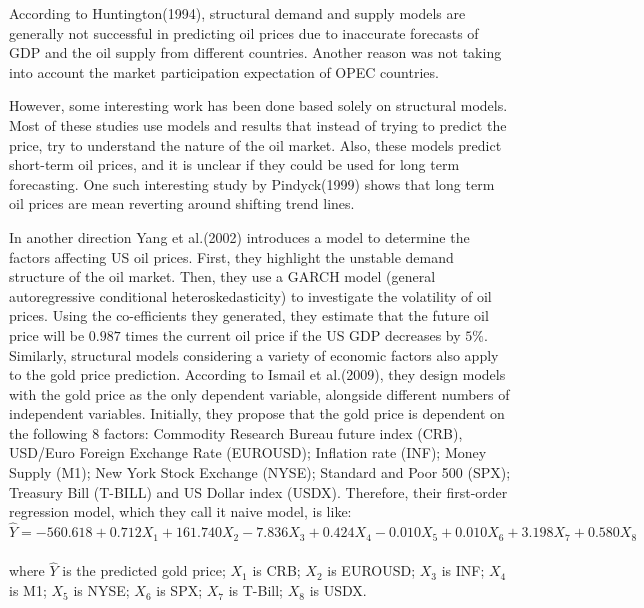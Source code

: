 \documentclass[runningheads]{llncs}
\begin{document}
According to Huntington(1994)\cite{huntington}, structural demand and supply models are generally not successful in predicting oil prices due to inaccurate forecasts of GDP and the oil supply from different countries. Another reason was not taking into account the market participation expectation of OPEC countries. 

However, some interesting work has been done based solely on structural models. Most of these studies use models and results that instead of trying to predict the price, try to understand the nature of the oil market. Also, these models predict short-term oil prices, and it is unclear if they could be used for long term forecasting. One such interesting study by Pindyck(1999)\cite{pindyck} shows that long term oil prices are mean reverting around shifting trend lines. 

In another direction Yang et al.(2002) \cite{yang} introduces a model to determine the factors affecting US oil prices. First, they highlight the unstable demand structure of the oil market. Then, they use a GARCH model (general autoregressive conditional heteroskedasticity) to investigate the volatility of oil prices. Using the co-efficients they generated, they estimate that the future oil price will be $0.987$ times the current oil price if the US GDP decreases by $5\%$. \\

Similarly, structural models considering a variety of economic factors also apply to the gold price prediction. According to Ismail et al.(2009)\cite{gold-Ismail}, they design models with the gold price as the only dependent variable, alongside different numbers of independent variables. Initially, they propose that the gold price is dependent on the following 8 factors: Commodity Research Bureau future index (CRB), USD/Euro Foreign Exchange Rate (EUROUSD); Inflation rate (INF); Money Supply (M1); New York Stock Exchange (NYSE); Standard and Poor 500 (SPX); Treasury Bill (T-BILL) and US Dollar index (USDX). Therefore, their first-order regression model, which they call it naive model, is like: \\

$\hat{Y}=-560.618+0.712X_1+161.740X_2-7.836X_3 +0.424X_4-0.010X_5+0.010X_6+3.198X_7+0.580X_8$ \\\\
where $\hat{Y}$ is the predicted gold price; $X_1$ is CRB; $X_2$ is EUROUSD; $X_3$ is INF; $X_4$ is M1; $X_5$ is NYSE; $X_6$ is SPX; $X_7$ is T-Bill; $X_8$ is USDX.\\
\end{document}

